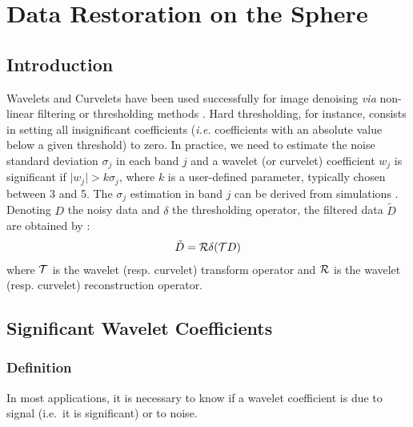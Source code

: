 
\chapter{Data Restoration on the Sphere}
\label{ch_restore}

\label{sect_exp}
\section{Introduction}

Wavelets and Curvelets have been used successfully for image denoising \emph{via} non-linear filtering or 
thresholding methods \cite{starck:book02,starck:sta01_3}. Hard thresholding, for instance, consists in 
setting all insignificant coefficients (\emph{i.e.} coefficients with an absolute value below a given 
threshold) to zero. In practice, we need to estimate the noise standard deviation $\sigma_j$ in each band 
$j$ and a wavelet (or curvelet) coefficient $w_j$ is significant if $\mid w_j \mid > k \sigma_j$, where $k$ 
is a user-defined parameter, typically chosen between 3 and 5. The $\sigma_j$ estimation in band $j$ can be 
derived from simulations \cite{starck:book02}. Denoting $D$ the noisy data and $\delta$ the thresholding 
operator, the filtered data $\tilde D$ are obtained by : 
\begin{eqnarray}
 {\tilde D} =    {\cal R} \delta( {\cal T} D)
\end{eqnarray}
where ${\cal T}$ is the wavelet (resp. curvelet) transform operator and ${\cal R}$ is the wavelet (resp. curvelet) reconstruction operator. 


\section{Significant Wavelet Coefficients}
\label{ch_noise}
\subsection{Definition}

In most applications, it is necessary to know if a wavelet coefficient is due to signal (i.e.\ it is significant) or to noise. 

